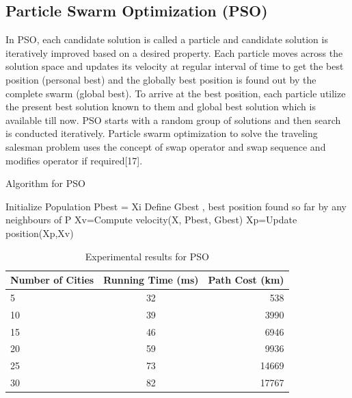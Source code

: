 \documentclass[conference]{IEEEtran}
\begin{document}
\subsection {Particle Swarm Optimization (PSO)}
In PSO, each candidate solution is called a particle and candidate solution is iteratively improved based on a desired property. Each particle moves across the solution space and  updates its velocity at regular interval of time to get the best position (personal best) and the globally best position is found out by the complete swarm (global best). To arrive at the best position, each particle utilize the present best solution known to them and global best solution which is available till now. PSO starts with a random group of solutions and then search is conducted iteratively. Particle swarm optimization to solve the traveling salesman problem uses the concept of swap operator and swap sequence and modifies operator if required[17]. 

\begin{algorithm}[H]
\caption{Algorithm for PSO}
\begin{algorithmic}[1]
\STATE Initialize Population
\REPEAT
{}
\STATE Pbest = Xi
\ENDIF
\ENDFOR 
\STATE Define Gbest , best position found so far by any neighbours of P
\STATE Xv=Compute velocity(X, Pbest, Gbest)
\STATE Xp=Update position(Xp,Xv)
\ENDFOR
{} 
\end{algorithmic}
\end{algorithm} 



\begin{table}[h!]
  \begin{center}
    \label{tab:table2}
    \begin{tabular}{l|c|r}
      \textbf{Number of Cities} & \textbf{Running Time (ms)} & \textbf{Path Cost (km)}\\
      \hline
      5 & 32 & 538\\
      10 & 39 & 3990\\
      15 & 46 & 6946\\
      20 & 59 & 9936\\ 
      25 & 73 & 14669\\
      30 & 82 & 17767\\
    \end{tabular}
    \caption{Experimental results for PSO}
  \end{center}
\end{table}
\end{document}
